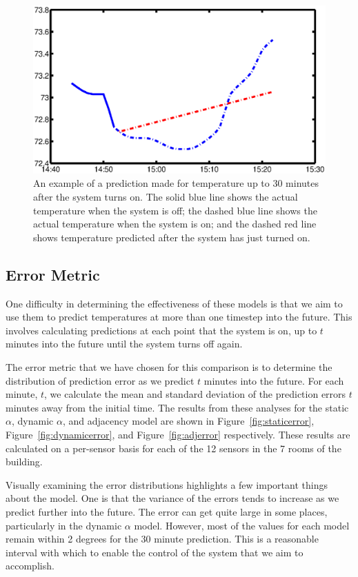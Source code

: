 \begin{figure}
\begin{center}
\includegraphics[width=0.6\columnwidth]{fig/ExamplePrediction.eps}
\end{center}
\caption[An example of a temperature prediction.]{An example of a prediction
  made for temperature up to 30 minutes after the system turns on. The solid
  blue line shows the actual temperature when the system is off; the dashed blue
  line shows the actual temperature when the system is on; and the dashed red
  line shows temperature predicted after the system has just turned on.}
\label{fig:expred}
\end{figure}

\subsection{Error Metric}
\label{sec:errormetric}
One difficulty in determining the effectiveness of these models is that we aim
to use them to predict temperatures at more than one timestep into the
future. This involves calculating predictions at each point that the system is
on, up to $t$ minutes into the future until the system turns off again.

The error metric that we have chosen for this comparison is to determine the
distribution of prediction error as we predict $t$ minutes into the future. For
each minute, $t$, we calculate the mean and standard deviation of the prediction
errors $t$ minutes away from the initial time. The results from these analyses
for the static $\alpha$, dynamic $\alpha$, and adjacency model are shown in
Figure~\ref{fig:staticerror}, Figure~\ref{fig:dynamicerror}, and
Figure~\ref{fig:adjerror} respectively. These results are calculated on a
per-sensor basis for each of the 12 sensors in the 7 rooms of the building.

Visually examining the error distributions highlights a few important things
about the model. One is that the variance of the errors tends to increase as we
predict further into the future. The error can get quite large in some places,
particularly in the dynamic $\alpha$ model. However, most of the values for each
model remain within 2 degrees for the 30 minute prediction. This is a reasonable
interval with which to enable the control of the system that we aim to
accomplish.


